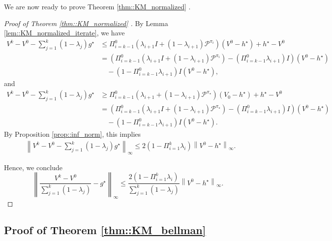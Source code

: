 \documentclass{article} %
\newcommand{\cP}{\mathcal{P}}
\newcommand*{\para}[1]{\left({#1}\right)}
\newcommand*{\infn}[1]{\left\|{#1}\right\|_{\infty}}
\begin{document}
We are now ready to prove Theorem \ref{thm::KM_normalized} .
\begin{proof}[Proof of Theorem \ref{thm::KM_normalized} ]
By Lemma \ref{lem::KM_normalized_iterate}, we have 
\begin{align*}
    V^k-V^0- \sum^{k}_{j=1} (1-\lambda_{j})g^{\star} &\le \Pi^{0}_{i=k-1}(\lambda_{i+1}I+(1-\lambda_{i+1}) \cP^{\pi_i}) (V^0-h^{\star})+ h^{\star}-V^0
    \\& = \para{\Pi^{0}_{i=k-1}(\lambda_{i+1}I +(1-\lambda_{i+1}) \cP^{\pi_i})-(\Pi^{0}_{i=k-1}\lambda_{i+1})I} (V^0-h^{\star})
    \\& \quad -(1-\Pi^{0}_{i=k-1}\lambda_{i+1})I(V^0-h^{\star}), 
\end{align*}
and
\begin{align*}
  V^k-V^0-\sum^{k}_{j=1} (1-\lambda_{j})g^{\star} &\ge \Pi^{0}_{i=k-1}(\lambda_{i+1}+(1-\lambda_{i+1}) \cP^{\pi_{\star}})(V_0-h^{\star})+ h^{\star}-V^0     
    \\& = \para{\Pi^{0}_{i=k-1}(\lambda_{i+1}I +(1-\lambda_{i+1}) \cP^{\pi_{\star}})-(\Pi^{0}_{i=k-1}\lambda_{i+1})I} (V^0-h^{\star})
    \\& \quad -(1-\Pi^{0}_{i=k-1}\lambda_{i+1})I(V^0-h^{\star}).
\end{align*}
By Proposition \ref{prop::inf_norm}, this implies 
   \begin{align*}
       &\infn{V^k-V^0- \sum^{k}_{j=1} (1-\lambda_{j})g^{\star} } \le 2(1-\Pi^{k}_{i=1}\lambda_{i})\infn{V^0-h^{\star}}.
   \end{align*}

  Hence, we conclude 
    \[\infn{\frac{V^k-V^0}{\sum^{k}_{j=1} (1-\lambda_{j})}-g^{\star}} \le \frac{2(1-\Pi^{k}_{i=1}\lambda_{i})}{\sum^{k}_{j=1} (1-\lambda_{j})}\infn{V^0-h^{\star}}.\]
\end{proof}

\subsection{Proof of Theorem \ref{thm::KM_bellman}}
\end{document}
